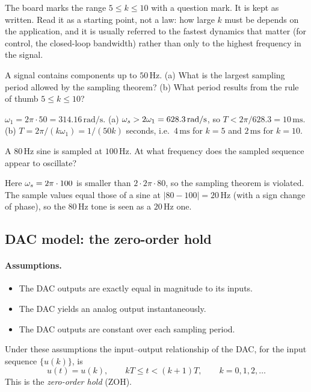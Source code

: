 \begin{boardnote}
The board marks the range $5\le k\le10$ with a question mark. It is kept as written. Read it as a
starting point, not a law: how large $k$ must be depends on the application, and it is usually referred
to the fastest dynamics that matter (for control, the closed-loop bandwidth) rather than only to the
highest frequency in the signal.
\end{boardnote}

\begin{problem}[Choosing $T$]
A signal contains components up to $50\,\mathrm{Hz}$. (a) What is the largest sampling period allowed by
the sampling theorem? (b) What period results from the rule of thumb $5\le k\le10$?
\end{problem}
\begin{solution}
$\omega_1=2\pi\cdot50=314.16\,\mathrm{rad/s}$. (a) $\omega_s>2\omega_1=628.3\,\mathrm{rad/s}$, so
$T<2\pi/628.3=10\,\mathrm{ms}$. (b) $T=2\pi/(k\omega_1)=1/(50k)$ seconds, i.e.\ $4\,\mathrm{ms}$ for
$k=5$ and $2\,\mathrm{ms}$ for $k=10$.
\end{solution}

\begin{problem}[Aliasing]
A $80\,\mathrm{Hz}$ sine is sampled at $100\,\mathrm{Hz}$. At what frequency does the sampled sequence
appear to oscillate?
\end{problem}
\begin{solution}
Here $\omega_s=2\pi\cdot100$ is smaller than $2\cdot2\pi\cdot80$, so the sampling theorem is violated. The
sample values equal those of a sine at $|80-100|=20\,\mathrm{Hz}$ (with a sign change of phase), so
the $80\,\mathrm{Hz}$ tone is seen as a $20\,\mathrm{Hz}$ one.
\end{solution}

\subsection{DAC model: the zero-order hold}
\paragraph{Assumptions.}
\begin{itemize}
  \item The DAC outputs are exactly equal in magnitude to its inputs.
  \item The DAC yields an analog output instantaneously.
  \item The DAC outputs are constant over each sampling period.
\end{itemize}
Under these assumptions the input--output relationship of the DAC, for the input sequence $\{u(k)\}$, is
\begin{equation}
  u(t)=u(k),\qquad kT\le t<(k+1)T,\qquad k=0,1,2,\dots
\end{equation}
This is the \emph{zero-order hold} (ZOH).

